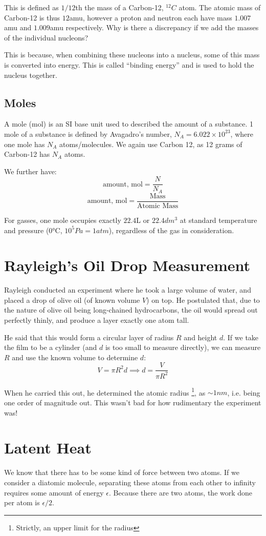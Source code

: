 This is defined as $1/12$th the mass of a Carbon-12, ${}^{12} C$ atom. The atomic mass of Carbon-12 is thus $12$amu, however a proton and neutron each have mass $1.007$amu and $1.009$amu respectively. Why is there a discrepancy if we add the masses of the individual nucleons?

This is because, when combining these nucleons into a nucleus, some of this mass is converted into energy. This is called ``binding energy'' and is used to hold the nucleus together.

\subsection{Moles}
A mole ($\si{\mole}$) is an SI base unit used to described the amount of a substance. 1 mole of a substance is defined by Avagadro's number, $N_A = 6.022 \times 10^{23}$, where one mole has $N_A$ atoms/molecules. We again use Carbon 12, as 12 grams of Carbon-12 has $N_A$ atoms.

We further have:
\[
    \text{amount, mol} = \frac{N}{N_A}
\]
\[
    \text{amount, mol} = \frac{\text{Mass}}{\text{Atomic Mass}}
\]

For gasses, one mole occupies exactly $22.4$L or $22.4\si{dm^3}$ at standard temperature and pressure ($0\si{\degreeCelsius}$, $10^5\si{Pa} = 1\si{atm}$), regardless of the gas in consideration.

\section{Rayleigh's Oil Drop Measurement}
Rayleigh conducted an experiment where he took a large volume of water, and placed a drop of olive oil (of known volume $V$) on top. He postulated that, due to the nature of olive oil being long-chained hydrocarbons, the oil would spread out perfectly thinly, and produce a layer exactly one atom tall.

He said that this would form a circular layer of radius $R$ and height $d$. If we take the film to be a cylinder (and $d$ is too small to measure directly), we can measure $R$ and use the known volume to determine $d$:
\[
    V = \pi R^2 d \implies d = \frac{V}{\pi R^2}
\]

When he carried this out, he determined the atomic radius \footnote{Strictly, an upper limit for the radius}, as $\sim 1 \si{nm}$, i.e. being one order of magnitude out. This wasn't bad for how rudimentary the experiment was!

\section{Latent Heat}
We know that there has to be some kind of force between two atoms. If we consider a diatomic molecule, separating these atoms from each other to infinity requires some amount of energy $\epsilon$. Because there are two atoms, the work done per atom is $\epsilon / 2$.

